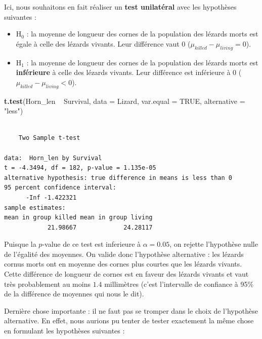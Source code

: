 \documentclass[a4paperpaper,]{article}
\newenvironment{Shaded}{\begin{snugshade}}{\end{snugshade}}
\newcommand{\DataTypeTok}[1]{\textcolor[rgb]{0.00,0.34,0.68}{#1}}
\newcommand{\KeywordTok}[1]{\textcolor[rgb]{0.12,0.11,0.11}{\textbf{#1}}}
\newcommand{\NormalTok}[1]{\textcolor[rgb]{0.12,0.11,0.11}{#1}}
\newcommand{\OperatorTok}[1]{\textcolor[rgb]{0.12,0.11,0.11}{#1}}
\newcommand{\OtherTok}[1]{\textcolor[rgb]{0.00,0.43,0.16}{#1}}
\newcommand{\StringTok}[1]{\textcolor[rgb]{0.75,0.01,0.01}{#1}}
\providecommand{\tightlist}{%
  \setlength{\itemsep}{0pt}\setlength{\parskip}{0pt}}
\begin{document}
Ici, nous souhaitons en fait réaliser un \textbf{test unilatéral} avec les hypothèses suivantes :

\begin{itemize}
\tightlist
\item
  H\(_0\) : la moyenne de longueur des cornes de la population des lézards morts est égale à celle des lézards vivants. Leur différence vaut 0 (\(\mu_{killed}-\mu_{living} = 0\)).
\item
  H\(_1\) : la moyenne de longueur des cornes de la population des lézards morts est \textbf{inférieure} à celle des lézards vivants. Leur différence est inférieure à 0 (\(\mu_{killed}-\mu_{living} < 0\)).
\end{itemize}

\begin{Shaded}
\begin{Highlighting}[]
\KeywordTok{t.test}\NormalTok{(Horn_len }\OperatorTok{~}\StringTok{ }\NormalTok{Survival, }
       \DataTypeTok{data =}\NormalTok{ Lizard, }\DataTypeTok{var.equal =} \OtherTok{TRUE}\NormalTok{,}
       \DataTypeTok{alternative =} \StringTok{"less"}\NormalTok{)}
\end{Highlighting}
\end{Shaded}

\begin{verbatim}

    Two Sample t-test

data:  Horn_len by Survival
t = -4.3494, df = 182, p-value = 1.135e-05
alternative hypothesis: true difference in means is less than 0
95 percent confidence interval:
      -Inf -1.422321
sample estimates:
mean in group killed mean in group living 
            21.98667             24.28117 
\end{verbatim}

Puisque la \(p\)-value de ce test est inferieure à \(\alpha = 0.05\), on rejette l'hypothèse nulle de l'égalité des moyennes. On valide donc l'hypothèse alternative : les lézards cornus morts ont en moyenne des cornes plus courtes que les lézards vivants. Cette différence de longueur de cornes est en faveur des lézards vivants et vaut très probablement au moins \(1.4\) millimètres (c'est l'intervalle de confiance à 95\% de la différence de moyennes qui nous le dit).

Dernière chose importante : il ne faut pas se tromper dans le choix de l'hypothèse alternative. En effet, nous aurions pu tenter de tester exactement la même chose en formulant les hypothèses suivantes :
\end{document}
